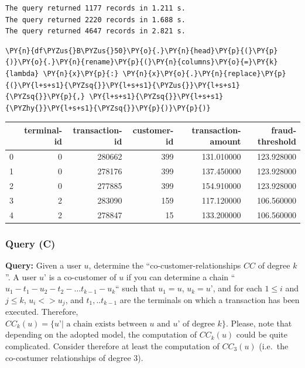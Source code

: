     \begin{Verbatim}[commandchars=\\\{\}]
The query returned 1177 records in 1.211 s.
The query returned 2220 records in 1.688 s.
The query returned 4647 records in 2.821 s.
    \end{Verbatim}

    \begin{tcolorbox}[breakable, size=fbox, boxrule=1pt, pad at break*=1mm,colback=cellbackground, colframe=cellborder]
\begin{Verbatim}[commandchars=\\\{\}]
\PY{n}{df\PYZus{}B\PYZus{}50}\PY{o}{.}\PY{n}{head}\PY{p}{(}\PY{p}{)}\PY{o}{.}\PY{n}{rename}\PY{p}{(}\PY{n}{columns}\PY{o}{=}\PY{k}{lambda} \PY{n}{x}\PY{p}{:} \PY{n}{x}\PY{o}{.}\PY{n}{replace}\PY{p}{(}\PY{l+s+s1}{\PYZsq{}}\PY{l+s+s1}{\PYZus{}}\PY{l+s+s1}{\PYZsq{}}\PY{p}{,} \PY{l+s+s1}{\PYZsq{}}\PY{l+s+s1}{\PYZhy{}}\PY{l+s+s1}{\PYZsq{}}\PY{p}{)}\PY{p}{)}
\end{Verbatim}
\end{tcolorbox}
 
            
    
    \begin{center}
\begin{tabular}{lrrrrr}
\toprule
 & terminal-id & transaction-id & customer-id & transaction-amount & fraud-threshold \\
\midrule
0 & 0 & 280662 & 399 & 131.010000 & 123.928000 \\
1 & 0 & 278176 & 399 & 137.450000 & 123.928000 \\
2 & 0 & 277885 & 399 & 154.910000 & 123.928000 \\
3 & 2 & 283090 & 159 & 117.120000 & 106.560000 \\
4 & 2 & 278847 & 15 & 133.200000 & 106.560000 \\
\bottomrule
\end{tabular}

\end{center}

    

    \hypertarget{query-c}{%
\subsubsection{Query (C)}\label{query-c}}

    \textbf{Query:} Given a user \(u\), determine the
``co-customer-relationships \(CC\) of degree \(k\)''. A user \(u’\) is a
co-customer of \(u\) if you can determine a chain
``\(u_1-t_1-u_2-t_2-…t_{k-1}-u_k\)`` such that \(u_1=u\), \(u_k=u’\),
and for each \(1 \leq i\) and \(j \leq k\), \(u_i<>u_j\), and
\(t_1,..t_{k-1}\) are the terminals on which a transaction has been
executed. Therefore,
\(CC_k(u)=\{u’| \text{ a chain exists between } u \text{ and } u’ \text{ of degree } k\}\).
Please, note that depending on the adopted model, the computation of
\(CC_k(u)\) could be quite complicated. Consider therefore at least the
computation of \(CC_3(u)\) (i.e.~the co-costumer relationships of degree
3).

